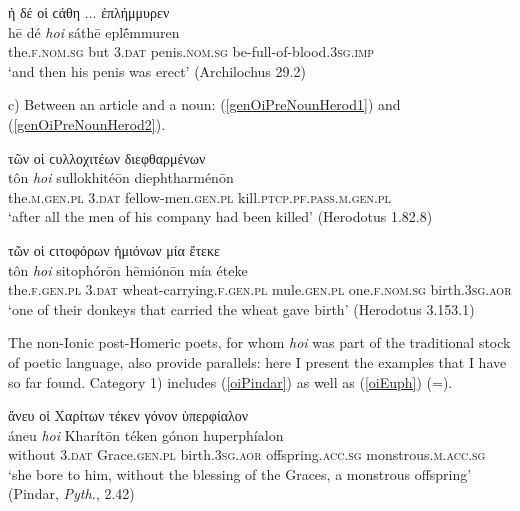 \begin{exe}
\ex ἡ δέ {οἱ} ϲάθη ... ἐπλήμμυρεν\\
\gll hē dé \emph{hoi} sáthē eplḗmmuren\\
the.\textsc{f.nom.sg} but \textsc{3.dat} penis.\textsc{nom.sg} be-full-of-blood.\textsc{3sg.imp}\\
\trans `and then his penis was erect' (Archilochus 29.2)
\label{genOiArchi2}
\end{exe}

c) Between an article and a noun: (\ref{genOiPreNounHerod1}) and (\ref{genOiPreNounHerod2}).

\begin{exe}
\ex τῶν {οἱ} ϲυλλοχιτέων διεφθαρμένων\\
\gll tôn \emph{hoi} sullokhitéōn diephtharménōn\\
the.\textsc{m.gen.pl} \textsc{3.dat} fellow-men.\textsc{gen.pl} kill.\textsc{ptcp.pf.pass.m.gen.pl}\\
\trans `after all the men of his company had been killed' (Herodotus 1.82.8)
\label{genOiPreNounHerod1}
\end{exe}

\begin{exe}
\ex τῶν {οἱ} ϲιτοφόρων ἡμιόνων μία ἔτεκε\\
\gll tôn \emph{hoi} sitophórōn hēmiónōn mía éteke\\
the.\textsc{f.gen.pl} \textsc{3.dat} wheat-carrying.\textsc{f.gen.pl} mule.\textsc{gen.pl} one.\textsc{f.nom.sg} birth.\textsc{3sg.aor}\\
\trans `one of their donkeys that carried the wheat gave birth' (Herodotus 3.153.1)
\label{genOiPreNounHerod2}
\end{exe}

The non-Ionic post-Homeric poets, for whom \emph{hoi} was part of the traditional stock of poetic language, also provide parallels: here I present the examples that I have so far found. Category 1) includes (\ref{oiPindar}) as well as (\ref{oiEuph}) (=\citealp[164]{Meineke1843}).

\begin{exe}
\ex ἄνευ {οἱ} Χαρίτων {τέκεν} γόνον ὑπερφίαλον\\
\gll áneu \emph{hoi} Kharítōn {téken} gónon huperphíalon\\
without \textsc{3.dat} Grace.\textsc{gen.pl} birth.\textsc{3sg.aor} offspring.\textsc{acc.sg} monstrous.\textsc{m.acc.sg}\\
\trans `she bore to him, without the blessing of the Graces, a monstrous offspring' (Pindar, \emph{Pyth.}, 2.42)
\label{oiPindar}
\end{exe}

